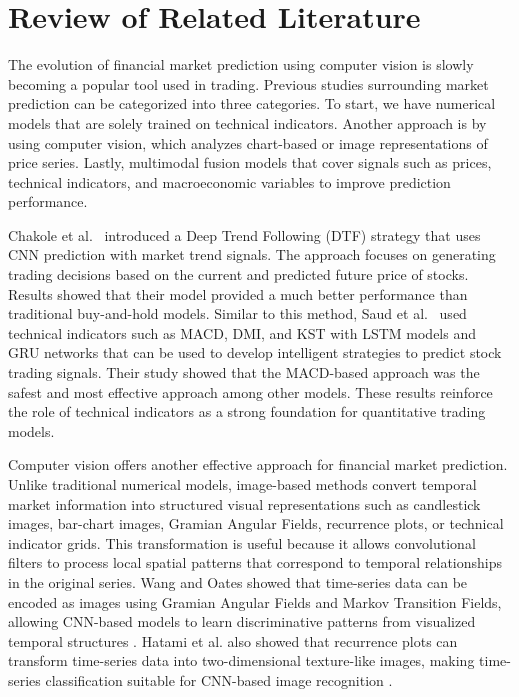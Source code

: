 

\chapter{Review of Related Literature}\label{sec:RRL}
The evolution of financial market prediction using computer vision is slowly becoming a popular tool used in trading. Previous studies surrounding market prediction can be categorized into three categories. To start, we have numerical models that are solely trained on technical indicators. Another approach is by using computer vision, which analyzes chart-based or image representations of price series. Lastly, multimodal fusion models that cover signals such as prices, technical indicators, and macroeconomic variables to improve prediction performance.

Chakole et al.\ \cite{chakole2021convolutional} introduced a Deep Trend Following (DTF) strategy that uses CNN prediction with market trend signals. The approach focuses on generating trading decisions based on the current and predicted future price of stocks. Results showed that their model provided a much better performance than traditional buy-and-hold models. Similar to this method, Saud et al.\ \cite{saud2024technical} used technical indicators such as MACD, DMI, and KST with LSTM models and GRU networks that can be used to develop intelligent strategies to predict stock trading signals. Their study showed that the MACD-based approach was the safest and most effective approach among other models. These results reinforce the role of technical indicators as a strong foundation for quantitative trading models.

Computer vision offers another effective approach for financial market prediction. 
Unlike traditional numerical models, image-based methods convert temporal market information into structured visual representations such as candlestick images, bar-chart images, Gramian Angular Fields, recurrence plots, or technical indicator grids. 
This transformation is useful because it allows convolutional filters to process local spatial patterns that correspond to temporal relationships in the original series. 
Wang and Oates showed that time-series data can be encoded as images using Gramian Angular Fields and Markov Transition Fields, allowing CNN-based models to learn discriminative patterns from visualized temporal structures \cite{wang2015encoding}. 
Hatami et al. also showed that recurrence plots can transform time-series data into two-dimensional texture-like images, making time-series classification suitable for CNN-based image recognition \cite{hatami2018classification}. 

